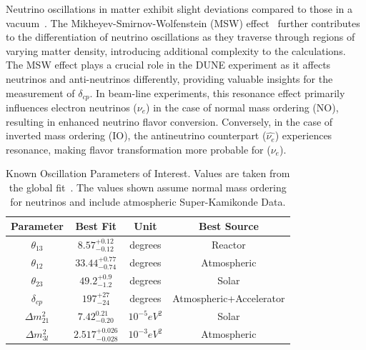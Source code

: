Neutrino oscillations in matter exhibit slight deviations compared to those in a vacuum~\citep{PhysRevD.17.2369}.
The Mikheyev-Smirnov-Wolfenstein (MSW) effect~\citep{Smirnov2004TheME} further contributes to the differentiation of neutrino oscillations as they traverse through regions of varying matter density, introducing additional complexity to the calculations.
The MSW effect plays a crucial role in the DUNE experiment as it affects neutrinos and anti-neutrinos differently, providing valuable insights for the measurement of $\delta_{cp}$.
In beam-line experiments, this resonance effect primarily influences electron neutrinos ($\nu_{e}$) in the case of normal mass ordering (NO), resulting in enhanced neutrino flavor conversion.
Conversely, in the case of inverted mass ordering (IO), the antineutrino counterpart ($\hat{\nu_{e}}$) experiences resonance, making flavor transformation more probable for ($\nu_{e}$).
\begin{table}
\begin{center}
\begin{tabular}{||c c c c||}
 \hline
 Parameter & Best Fit & Unit & Best Source\\ [0.5ex]
 \hline\hline
  $\theta_{13}$ & $8.57^{+0.12}_{-0.12}$ & degrees & Reactor \\ %
  $\theta_{12}$ & $33.44^{+0.77}_{-0.74}$ & degrees & Atmospheric \\ %
  $\theta_{23}$ & $49.2^{+0.9}_{-1.2}$ & degrees & Solar \\ %
  $\delta_{cp}$ & $197^{+27}_{-24}$ & degrees & Atmospheric+Accelerator \\ %
  $\Delta m_{21}^{2}$ & $7.42^{0.21}_{-0.20}$ & $10^{-5}eV^{2}$ & Solar \\ %
  $\Delta m_{3l}^{2}$ & $2.517^{+0.026}_{-0.028}$ & $10^{-3}eV^{2}$ & Atmospheric  \\
 \hline
\end{tabular}
\caption{Known Oscillation Parameters of Interest.
Values are taken from the global fit~\citep{2020JHEP...09..178E}.
The values shown assume normal mass ordering for neutrinos and include atmospheric Super-Kamikonde Data.
}
\label{table:pmns_params}
\end{center}
\end{table}